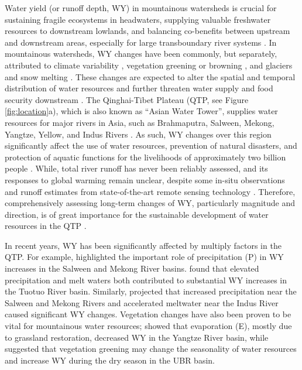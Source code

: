 \documentclass[hess, manuscript]{copernicus}
\begin{document}
\introduction
Water yield (or runoff depth, WY) in mountainous watersheds is crucial for sustaining fragile ecosystems in headwaters, supplying valuable freshwater resources to downstream lowlands, and balancing co-benefits between upstream and downstream areas, especially for large transboundary river systems \citep{viviroli2011climate}. In mountainous watersheds, WY changes have been commonly, but separately, attributed to climate variability \citep{dierauer2018climate,song2021river}, vegetation greening or browning \citep{goulden2014mountain,zhou2021divergent}, and glaciers and snow melting \citep{huss2018global, biemans2019importance}. These changes are expected to alter the spatial and temporal distribution of water resources \citep{tang2019streamflow} and further threaten water supply and food security downstream \citep{biemans2019importance}. The Qinghai-Tibet Plateau (QTP, see Figure \ref{fig:location}a), which is also known as “Asian Water Tower”, supplies water resources for major rivers in Asia, such as Brahmaputra, Salween, Mekong, Yangtze, Yellow, and Indus Rivers \citep{kang2010review,yao2010glacial,yao2019recent}. As such, WY changes over this region significantly affect the use of water resources, prevention of natural disasters, and protection of aquatic functions for the livelihoods of approximately two billion people \citep{immerzeel2010climate}. While, total river runoff has never been reliably assessed, and its responses to global warming remain unclear, despite some in-situ observations and runoff estimates from state-of-the-art remote sensing technology \citep{wang2021tp}. Therefore, comprehensively assessing long-term changes of WY, particularly magnitude and direction, is of great importance for the sustainable development of water resources in the  QTP \citep{yao2019recent}. 

In recent years, WY has been significantly affected by multiply factors in the QTP. For example, \citet{fan2015temperature} highlighted the important role of precipitation (P) in WY increases in the Salween and Mekong River basins. \citet{li2020substantial} found that elevated precipitation and melt waters both contributed to substantial WY increases in the Tuotuo River basin. Similarly, \citet{lutz2014consistent} projected that increased precipitation near the Salween and Mekong Rivers and accelerated meltwater near the Indus River caused significant WY changes. Vegetation changes have also been proven to be vital for mountainous water resources; \citet{li2017grassland} showed that evaporation (E), mostly due to grassland restoration, decreased WY in the Yangtze River basin, while \citet{li2021vegetation} suggested that vegetation greening may change the seasonality of water resources and increase WY during the dry season in the UBR basin.
\end{document}
